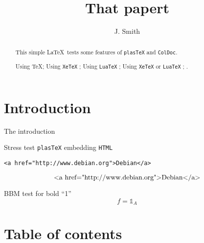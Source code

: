 \documentclass[a4paper]{article}
\newif\ifplastex\plastexfalse
\newcommand\mathbbm[1]{{\mathbb{#1}}}
\newcommand\mathbbm[1]{{\mathbb{#1}}}
\begin{document}
\author{J. Smith}
\title{That papert}
\maketitle
\section*{Introduction}
The introduction

\begin{abstract}
  This simple \LaTeX\ tests some features
  of \texttt{plasTeX} and \texttt{ColDoc}.

  \ifetex Using  \TeX \fi ;
  \ifxetex Using \texttt{XeTeX} \fi ;
  \ifluatex Using \texttt{LuaTeX} \fi ;
  \iftutex Using \texttt{XeTeX} or \texttt{LuaTeX} \fi ;
  \ifplastex Using \texttt{plasTeX} \fi .

\end{abstract}

Stress test  \texttt{plasTeX} embedding \texttt{HTML}
\begin{verbatim}
<a href="http://www.debian.org">Debian</a>
\end{verbatim}
\[ \hbox{<a href="http://www.debian.org">Debian</a>} \]

BBM test for bold ``1''
\[f={\mathbbm{1}}_A\]





\section*{Table of contents}
\tableofcontents



\end{document}
